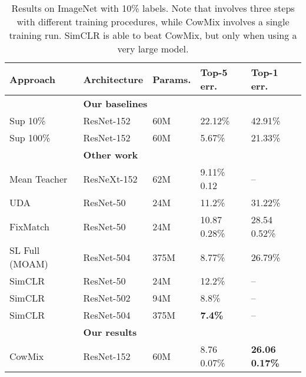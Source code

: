 \documentclass{article}
\newcommand{\eb}[1]{\scriptsize\,\,#1}
\begin{document}
\begin{table}[h]
\centering
\begin{tabular}{lllll}

\hline
Approach                                        & Architecture          & Params.   & Top-5 err.        & Top-1 err.       \\
\hline
\hline
& \multicolumn{3}{l}{\footnotesize{\textbf{Our baselines}}} \\
Sup 10\%                                        & ResNet-152            & 60M       & 22.12\%           & 42.91\%           \\
Sup 100\%                                       & ResNet-152            & 60M       & 5.67\%            & 21.33\%           \\

\hline
& \multicolumn{3}{l}{\footnotesize{\textbf{Other work}}} \\
Mean Teacher~\cite{Tarvainen:MeanTeachers}      & ResNeXt-152           & 62M       & 9.11\%\eb{0.12}   & --                \\
UDA~\cite{Xie:UDA}                              & ResNet-50             & 24M       & 11.2\%            & 31.22\%           \\
FixMatch~\cite{Sohn:FixMatch}                   & ResNet-50             & 24M       & 10.87\eb{0.28\%}  & 28.54\eb{0.52\%}  \\
SL Full (MOAM)~\cite{Zhai:S4L}              & ResNet-504    & 375M      & 8.77\%            & 26.79\%           \\
SimCLR~\cite{Chen:SimCLR}                       & ResNet-50             & 24M       & 12.2\%            & --                \\
SimCLR                                          & ResNet-502    & 94M       & 8.8\%             & --                \\
SimCLR                                          & ResNet-504    & 375M      & \bf7.4\%          & --                \\
\hline
& \multicolumn{3}{l}{\footnotesize{\textbf{Our results}}} \\

CowMix                                          & ResNet-152            & 60M       & 8.76\eb{0.07\%}   & \bf26.06\eb{0.17\%}  \\

\hline
\end{tabular}
\caption{Results on ImageNet with 10\% labels. Note that  involves three steps with different training procedures, while CowMix involves a single training run. SimCLR is able to beat CowMix, but only when using a very large model.}
\label{tab:results:imagenet}
\vspace{-1.5em}
\end{table}
\end{document}
